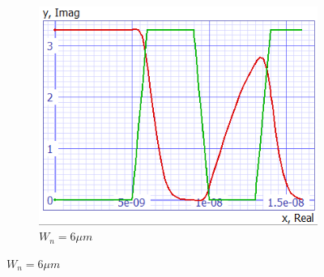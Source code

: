 \documentclass[../main.tex]{subfiles}
\begin{document}
{{\begin{figure}[H]
				\begin{subfigure}{0.3\textwidth}
					\centering
					\includegraphics[width=\textwidth]{plots/Q7_Wn6.png}
					\caption{$W_n = 6\mu m$}
					\label{fig:subfig3}
				\end{subfigure}
				

\end{figure}}}
\end{document}
